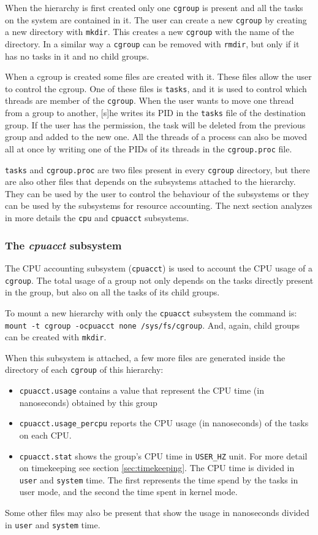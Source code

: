 When the hierarchy is first created only one \verb|cgroup| is present and all the tasks on the system are contained in it. The user can create a new \verb|cgroup| by creating a new directory with \verb|mkdir|. This creates a new \verb|cgroup| with the name of the directory. In a similar way a \verb|cgroup| can be removed with \verb|rmdir|, but only if it has no tasks in it and no child groups. 

When a cgroup is created some files are created with it. These files allow the user to control the cgroup. One of these files is \verb|tasks|, and it is used to control which threads are member of the \verb|cgroup|. When the user wants to move one thread from a group to another, [s]he writes its PID in the \verb|tasks| file of the destination group. If the user has the permission, the task will be deleted from the previous group and added to the new one. All the threads of a process can also be moved all at once by writing one of the PIDs of its threads in the \verb|cgroup.proc| file. 

\verb|tasks| and \verb|cgroup.proc| are two files present in every \verb|cgroup| directory, but there are also other files that depends on the subsystems attached to the hierarchy. They can be used by the user to control the behaviour of the subsystems or they can be used by the subsystems for resource accounting.  The next section analyzes in more details the \verb|cpu| and \verb|cpuacct| subsystems.

\subsubsection{The \textit{cpuacct} subsystem}

The CPU accounting subsystem (\verb|cpuacct|) is used to account the CPU usage of a \verb|cgroup|. The total usage of a group not only depends on the tasks directly present in the group, but also on all the tasks of its child groups.

To mount a new hierarchy with only the \verb|cpuacct| subsystem the command is: \verb|mount -t cgroup -ocpuacct none /sys/fs/cgroup|. And, again, child groups can be created with \verb|mkdir|.

When this subsystem is attached, a few more files are generated inside the directory of each \verb|cgroup| of this hierarchy:
\begin{itemize}
    \item \verb|cpuacct.usage| contains a value that represent the CPU time (in nanoseconds) obtained  by this group
    \item \verb|cpuacct.usage_percpu| reports the CPU usage (in nanoseconds) of the tasks on each CPU.
    \item \verb|cpuacct.stat| shows the group's CPU time in \verb|USER_HZ| unit. For more detail on timekeeping see section \ref{sec:timekeeping}. The CPU time is divided in \verb|user| and \verb|system| time. The first represents the time spend by the tasks in user mode, and the second the time spent in kernel mode.
\end{itemize}
Some other files may also be present that show the usage in nanoseconds divided in \verb|user| and \verb|system| time.

